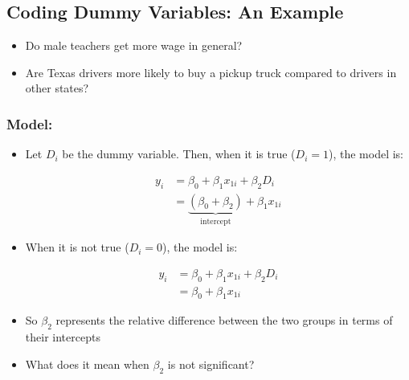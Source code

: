 \documentclass[10pt,article]{article}
\begin{document}
\subsection{Coding Dummy Variables: An Example}
\label{sec:org659b66a}
\begin{itemize}
\item Do male teachers get more wage in general?
\item Are Texas drivers more likely to buy a pickup truck compared to drivers in
other states?
\end{itemize}
\subsubsection{Model:}
\label{sec:org7354e77}
\begin{itemize}
\item Let \(D_i\) be the dummy variable. Then, when it is true (\(D_{i} =1\)), the model is:

\begin{align*} 
     y_i  & = \beta_0 + \beta_1 x_{1i} + \beta_2 D_i \\
          & = \underbrace{(\beta_0 + \beta_2)}_{\text{intercept}} + \beta_1 x_{1i} 
\end{align*}
\end{itemize}

\begin{itemize}
\item When it is not true (\(D_i = 0\)), the model is:

\begin{align*} 
    y_i & = \beta_0 + \beta_1 x_{1i} + \beta_2 D_i \\
        & = \beta_0 + \beta_1 x_{1i}
\end{align*}
\end{itemize}

\begin{itemize}
\item So \(\beta_2\) represents the relative difference between the two groups
in terms of their intercepts

\item What does it mean when \(\beta_2\) is not significant?
\end{itemize}
\end{document}
